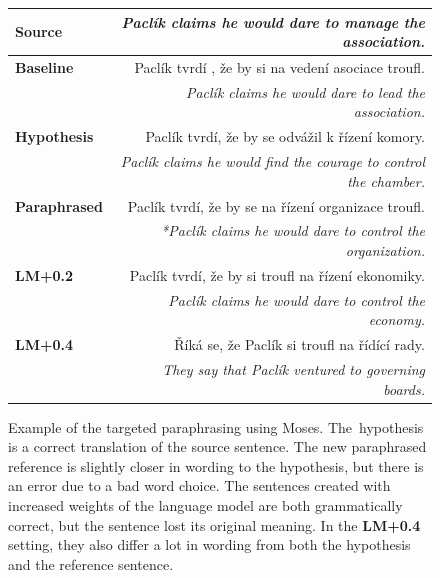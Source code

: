 \documentclass[11pt]{article}
\begin{document}
\begin{figure}[tb]
\begin{center}
\begin{tabular}{l|r}
 \textbf{Source } &  \textit{Paclík claims he would dare to manage the association.} \\
 \hline
 
 \textbf{Baseline} & Paclík tvrdí , že by si na vedení asociace troufl.\\
           & \textit{Paclík claims he would dare to lead the association.} \\

 \hline
 \textbf{Hypothesis} & Paclík tvrdí, že by se odvážil k řízení komory. \\
            & \textit{Paclík claims he would find the courage to control the chamber.}  \\ 

 \hline
 \textbf{Paraphrased} & Paclík tvrdí, že by se na řízení organizace troufl. \\
             & \textit{*Paclík claims he would dare to control the organization.}\\
 \hline 
 \textbf{LM+0.2} & Paclík tvrdí, že by si troufl na řízení ekonomiky. \\
               &\textit{ Paclík claims he would dare to control the economy.} \\
  
\hline 
 \textbf{LM+0.4} & Říká se, že Paclík si troufl na řídící rady. \\
               & \textit{They say that Paclík ventured to governing boards.} \\

\end{tabular}
\caption{Example of the targeted paraphrasing using Moses. The~hypothesis is 
a correct translation of the source sentence. The new paraphrased reference 
is slightly closer in wording to the hypothesis, but there is an error due to 
a bad word choice. The sentences created with increased weights of the 
language model are both grammatically correct, but the sentence lost its 
original meaning. In the \textbf{LM+0.4} setting, they also differ a lot in 
wording from both the hypothesis and the reference sentence.}
\label{example:Moses}
\end{center}
\end{figure}
\end{document}
